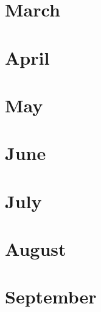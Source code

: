 \documentclass[12pt,letterpaper,oneside]{memoir}
\begin{document}
  \chapter{March}
  
  
  
  
  

  \chapter{April}
  
  
  

  \chapter{May}
  
  
  
  
  
  

  \chapter{June}
  
  
  
  

  \chapter{July}
  
  
  
  

  \chapter{August}
  
  
  

  \chapter{September}
  
  
  
  
  
  
  
\end{document}
